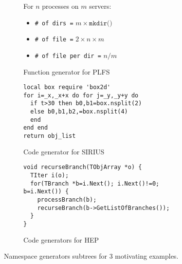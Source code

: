 


\begin{figure*}[tb]
  \centering
  \begin{subfigure}[b]{0.3\linewidth}
    For \(n\) processes on \(m\) servers:
    \begin{itemize}
      \setlength\itemsep{-0.5em}
      \item[] \texttt{\# of dirs =} \(m \times \texttt{mkdir()}\)
      \item[] \texttt{\# of file =} \(2 \times n \times m\)
      \item[] \texttt{\# of file per dir =} \(n/m\)
    \end{itemize}
    \caption{Function generator for PLFS\vspace{1em}} \label{fig:plfs}
  \end{subfigure}
  \begin{subfigure}[b]{0.3\linewidth}
      \footnotesize
      \begin{verbatim}
local box require 'box2d'
for i=_x,_x+x do for j=_y,_y+y do
  if t>30 then b0,b1=box.nsplit(2)
  else b0,b1,b2,=box.nsplit(4)
  end
end end 
return obj_list
     \end{verbatim}
      \caption{Code generator for SIRIUS\vspace{1em}} \label{fig:sirius}
  \end{subfigure}
  \begin{subfigure}[b]{0.35\linewidth}
      \centering
      \footnotesize
      \begin{verbatim}
void recurseBranch(TObjArray *o) {
  TIter i(o); 
  for(TBranch *b=i.Next(); i.Next()!=0; b=i.Next()) {
    processBranch(b);
    recurseBranch(b->GetListOfBranches());
  }
}
      \end{verbatim}
      \caption{Code generators for HEP\vspace{1em}} \label{fig:hep}
  \end{subfigure}
\caption{Namespace generators subtrees for 3 motivating examples.\label{fig:use-cases}}
\end{figure*}

